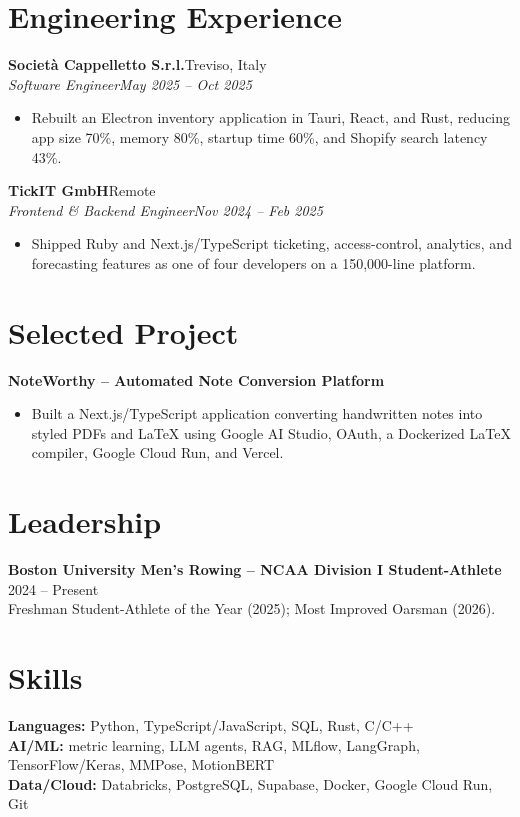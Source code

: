 \documentclass[letterpaper,10pt]{article}
\newcommand{\e}[4]{\textbf{#1}\hfill #2\\\textit{#3}\hfill\textit{#4}\vspace{-3pt}}\newcommand{\bi}{\begin{itemize}[leftmargin=.17in,itemsep=0pt,topsep=2pt]}\newcommand{\ei}{\end{itemize}\vspace{-4pt}}
\begin{document}
\section{Engineering Experience}
\e{Societ\`a Cappelletto S.r.l.}{Treviso, Italy}{Software Engineer}{May 2025 -- Oct 2025}\bi\item Rebuilt an Electron inventory application in Tauri, React, and Rust, reducing app size 70\%, memory 80\%, startup time 60\%, and Shopify search latency 43\%.\ei
\e{TickIT GmbH}{Remote}{Frontend \& Backend Engineer}{Nov 2024 -- Feb 2025}\bi\item Shipped Ruby and Next.js/TypeScript ticketing, access-control, analytics, and forecasting features as one of four developers on a 150,000-line platform.\ei
\section{Selected Project}
\textbf{NoteWorthy -- Automated Note Conversion Platform}\\[-2pt]\bi\item Built a Next.js/TypeScript application converting handwritten notes into styled PDFs and LaTeX using Google AI Studio, OAuth, a Dockerized LaTeX compiler, Google Cloud Run, and Vercel.\ei
\section{Leadership}\textbf{Boston University Men's Rowing -- NCAA Division I Student-Athlete} \hfill 2024 -- Present\\Freshman Student-Athlete of the Year (2025); Most Improved Oarsman (2026).
\section{Skills}\textbf{Languages:} Python, TypeScript/JavaScript, SQL, Rust, C/C++\\\textbf{AI/ML:} metric learning, LLM agents, RAG, MLflow, LangGraph, TensorFlow/Keras, MMPose, MotionBERT\\\textbf{Data/Cloud:} Databricks, PostgreSQL, Supabase, Docker, Google Cloud Run, Git
\end{document}
